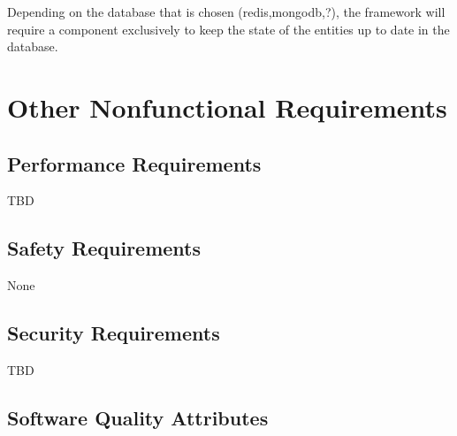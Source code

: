 \documentclass{scrreprt}
\begin{document}
Depending on the database that is chosen (redis,mongodb,?), the framework will require a component exclusively to keep the state of the entities up to date in the database.


\chapter{Other Nonfunctional Requirements}

\section{Performance Requirements}
TBD

\section{Safety Requirements}
None

\section{Security Requirements}
TBD

\section{Software Quality Attributes}
\end{document}
